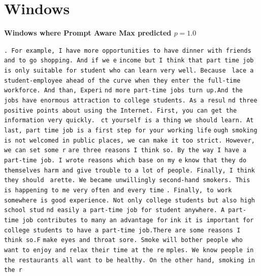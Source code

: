 \documentclass{article} %
\begin{document}
\section{Windows} \label{app-windows}
\textbf{Windows where Prompt Aware Max predicted $p = 1.0$}

\texttt{\fontsize{.28cm}{.1cm}\selectfont \frenchspacing . For example, I have more opportunities to have dinner with friends and to go shopping. And if we e}
\texttt{\fontsize{.28cm}{.1cm}\selectfont \frenchspacing income but I think that part time job is only suitable for student who can learn very well. Because }
\texttt{\fontsize{.28cm}{.1cm}\selectfont \frenchspacing lace a student-employee ahead of the curve when they enter the full-time workforce. And than, Experi}
\texttt{\fontsize{.28cm}{.1cm}\selectfont \frenchspacing nd more part-time jobs turn up.And the jobs have enormous attraction to college students. As a resul}
\texttt{\fontsize{.28cm}{.1cm}\selectfont \frenchspacing nd three positive points about using the Internet. First, you can get the information very quickly. }
\texttt{\fontsize{.28cm}{.1cm}\selectfont \frenchspacing ct yourself is a thing we should learn. At last, part time job is a first step for your working life}
\texttt{\fontsize{.28cm}{.1cm}\selectfont \frenchspacing ough smoking is not welcomed in public places, we can make it too strict. However, we can set some r}
\texttt{\fontsize{.28cm}{.1cm}\selectfont \frenchspacing  are three reasons I think so. By the way I have a part-time job. I wrote reasons which base on my e}
\texttt{\fontsize{.28cm}{.1cm}\selectfont \frenchspacing know that they do themselves harm and give trouble to a lot of people. Finally, I think they should }
\texttt{\fontsize{.28cm}{.1cm}\selectfont \frenchspacing arette. We became unwillingly second-hand smokers. This is happening to me very often and every time}
\texttt{\fontsize{.28cm}{.1cm}\selectfont \frenchspacing . Finally, to work somewhere is good experience. Not only college students but also high school stud}
\texttt{\fontsize{.28cm}{.1cm}\selectfont \frenchspacing nd easily a part-time job for student anywhere. A part-time job contributes to many an advantage for}
\texttt{\fontsize{.28cm}{.1cm}\selectfont \frenchspacing ink it is important for college students to have a part-time job.There are some reasons I think so.F}
\texttt{\fontsize{.28cm}{.1cm}\selectfont \frenchspacing make eyes and throat sore. Smoke will bother people who want to enjoy and relax their time at the re}
\texttt{\fontsize{.28cm}{.1cm}\selectfont \frenchspacing mples. We know people in the restaurants all want to be healthy. On the other hand, smoking in the r}
\end{document}
